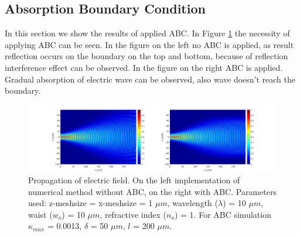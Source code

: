 \documentclass{article}
\begin{document}
	\subsection{Absorption Boundary Condition}
	In this section we show the results of applied ABC. In Figure \ref{fig:Absorption2} the necessity of applying ABC can be seen. In the figure on the left no ABC is applied, as result reflection occurs on the boundary on the top and bottom, because of reflection interference effect can be observed. In the figure on the right ABC is applied. Gradual absorption of electric wave can be observed, also wave doesn't reach the boundary.
	
	\begin{figure}[h!]
		\hspace{-30mm}
		\includegraphics[width=1.5\textwidth]{N3.jpg}
		\caption{\label{fig:Absorption2}Propagation of electric field. On the left implementation of numerical method without ABC, on the right with ABC. Parameters used: z-meshsize = x-meshsize  = 1 $\mu m$, wavelength ($\lambda$) = 10 $\mu m$, waist ($w_o$) = 10 $\mu m$, refractive index ($n_o$) = 1. For ABC simulation $\kappa_{max}$ = 0.0013, $\delta$ =  50 $\mu m$, $l$ = 200 $\mu m$.}
	\end{figure}
\end{document}
